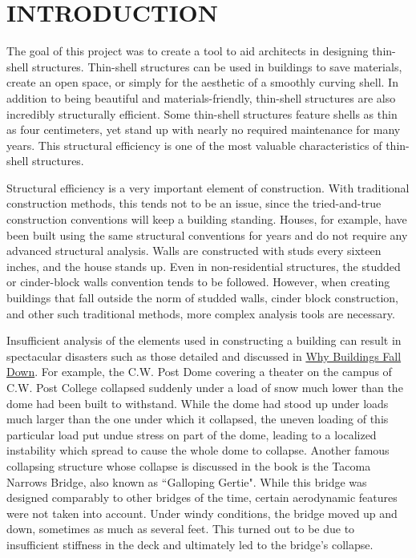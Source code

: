 \documentclass{thesis}
\begin{document}
\chapter{INTRODUCTION} \label{chp:introduction}

The goal of this project was to create a tool to aid architects in designing thin-shell structures.  Thin-shell structures can be used in
buildings to save materials, create an open space, or simply for the aesthetic of a smoothly curving shell.  In addition to being beautiful
and materials-friendly, thin-shell structures are also incredibly structurally efficient.  Some thin-shell structures feature shells as thin
as four centimeters, yet stand up with nearly no required maintenance for many years.  This structural efficiency is one of the most valuable
characteristics of thin-shell structures.

Structural efficiency is a very important element of construction.  With traditional construction methods, this tends not to be an issue, since
the tried-and-true construction conventions will keep a building standing.  Houses, for example, have been built using the same structural
conventions for years and do not require any advanced structural analysis.  Walls are constructed with studs every sixteen inches, and the house
stands up.  Even in non-residential structures, the studded or cinder-block walls convention tends to be followed.  However, when creating
buildings that fall outside the norm of studded walls, cinder block construction, and other such traditional methods, more complex analysis
tools are necessary.

Insufficient analysis of the elements used in constructing a building can result in spectacular disasters such as those
detailed and discussed in \underline{Why Buildings Fall} \underline{Down}\cite{levy92falldown}.  For example, the C.W. Post Dome covering a theater on the
campus of C.W. Post College collapsed suddenly under a load of snow much lower than the dome had been built to withstand.  While the dome had
stood up under loads much larger than the one under which it collapsed, the uneven loading of this particular load put undue stress on part
of the dome, leading to a localized instability which spread to cause the whole dome to collapse.  Another famous collapsing structure whose
collapse is discussed in the book is the Tacoma Narrows Bridge, also known as ``Galloping Gertie".  While this bridge was designed comparably
to other bridges of the time, certain aerodynamic features were not taken into account.  Under windy conditions, the bridge moved up and down,
sometimes as much as several feet.  This turned out to be due to insufficient stiffness in the deck and ultimately led to the bridge's
collapse.
\end{document}
